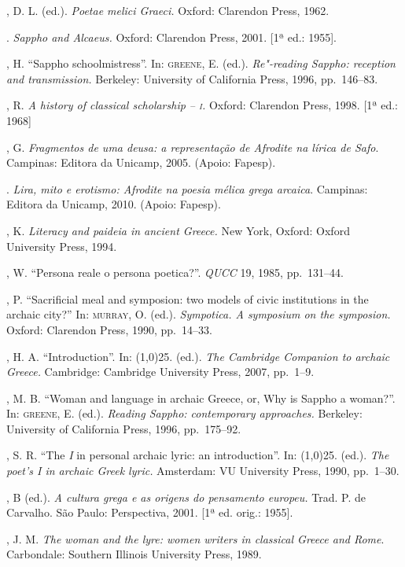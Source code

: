 \begin{bibliohedra}
, D. L. (ed.). \textit{Poetae melici Graeci.} Oxford: Clarendon
Press, 1962.

\titidem. \textit{Sappho and Alcaeus.} Oxford: Clarendon
Press, 2001. [1ª ed.: 1955].

, H. “Sappho schoolmistress”. In: \textsc{greene}, E. (ed.).
\textit{Re"-reading Sappho: reception and transmission.} Berkeley: University of
California Press, 1996, pp.~146--83.

, R. \textit{A history of classical scholarship -- \textsc{i}.} Oxford:
Clarendon Press, 1998. [1ª ed.: 1968]

, G. \textit{Fragmentos de uma deusa: a representação de Afrodite
na lírica de Safo}. Campinas: Editora da Unicamp, 2005. (Apoio: Fapesp).

\titidem. \textit{Lira, mito e erotismo: Afrodite na poesia mélica grega
arcaica}. Campinas: Editora da Unicamp, 2010. (Apoio: Fapesp).

, K. \textit{Literacy and paideia in ancient Greece.} New York,
Oxford: Oxford University Press, 1994.

, W. “Persona reale o persona poetica?”. \textit{QUCC} 19, 1985,
pp.~131--44.

, P. “Sacrificial meal and symposion: two models of
civic institutions in the archaic city?” In: \textsc{murray}, O. (ed.).
\textit{Sympotica. A symposium on the symposion.} Oxford: Clarendon Press,
1990, pp.~14--33.

, H. A. “Introduction”. In: \line(1,0){25}.
(ed.). \textit{The Cambridge Companion to archaic Greece.} Cambridge: Cambridge
University Press, 2007, pp.~1--9.

, M. B. “Woman and language in archaic Greece, or, Why is Sappho
a woman?”. In: \textsc{greene}, E. (ed.). \textit{Reading Sappho: contemporary
approaches.} Berkeley: University of California Press, 1996, pp.~175--92.

, S. R. “The \textit{I} in personal archaic lyric: an
introduction”. In: \line(1,0){25}. (ed.). \textit{The poet’s I in archaic Greek
lyric.} Amsterdam: VU University Press, 1990, pp.~1--30.

, B (ed.). \textit{A cultura grega e as origens do pensamento
europeu.} Trad. P. de Carvalho. São Paulo: Perspectiva, 2001. [1ª ed. orig.:
1955].

, J. M. \textit{The woman and the lyre: women writers in
classical Greece and Rome}. Carbondale: Southern Illinois University Press,
1989.


\end{bibliohedra}

